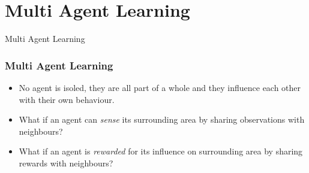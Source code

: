 \documentclass[dvipsnames]{beamer}
\begin{document}
\section{Multi Agent Learning}
\begin{frame}
\centering
\Huge
Multi Agent Learning
\end{frame}

\begin{frame}
\frametitle{Multi Agent Learning}

  {\footnotesize
  \begin{itemize}
    \item No agent is isoled, they are all part of a whole and they influence each other with their own behaviour.
    \item What if an agent can \textit{sense} its surrounding area by sharing observations with neighbours?
    \item What if an agent is \textit{rewarded} for its influence on surrounding area by sharing rewards with neighbours?
  \end{itemize}
  }


\end{frame}
\end{document}
